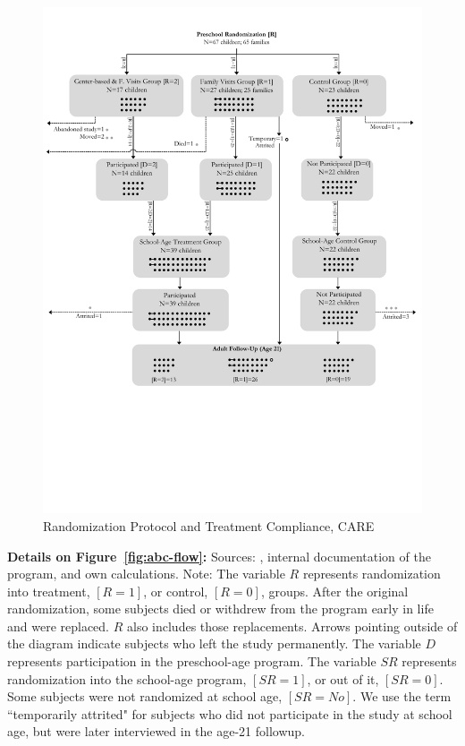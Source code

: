 	\begin{figure}[H]
		\caption{Randomization Protocol and Treatment Compliance, CARE} \label{fig:care-flow}
		\centering
		\includegraphics[width=.92\columnwidth]{output/care_Diagram.pdf}
	\end{figure}
\restoregeometry

\doublespacing

\noindent \textbf{Details on Figure~\ref{fig:abc-flow}:} Sources: \cite{Ramey_Collier_etal_1976_CarolinaAbecedarianProject, Ramey_Smith_1977_AJMD,Ramey_Campbell_1979_SR,Ramey_Campbell_1984_AJMD}, internal documentation of the program, and own calculations. Note: The variable $R$ represents randomization into treatment, $[R=1]$, or control, $[R=0]$, groups. After the original randomization, some subjects died or withdrew from the program early in life and were replaced. $R$ also includes those replacements. Arrows pointing outside of the diagram indicate subjects who left the study permanently. The variable $D$ represents participation in the preschool-age program. The variable $SR$ represents randomization into the school-age program, $[SR=1]$, or out of it, $[SR=0]$. Some subjects were not randomized at school age, $[SR=No]$. We use the term ``temporarily attrited" for subjects who did not participate in the study at school age, but were later interviewed in the age-21 followup. \\

